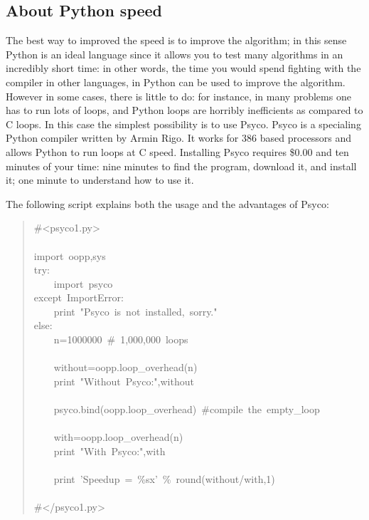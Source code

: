 \documentclass[10pt,english]{article}
\begin{document}

\hypertarget{about-python-speed}{}
\subsection*{About Python speed}

The best way to improved the speed is to improve the algorithm; in
this sense Python is an ideal language since it allows you to test
many algorithms in an incredibly short time: in other words, the time you 
would spend fighting with the compiler in other languages, in Python
can be used to improve the algorithm. 
However in some cases, there is little to do: for instance, in many
problems one has to run lots of loops, and Python loops are horribly
inefficients as compared to C loops. In this case the simplest possibility 
is to use Psyco. Psyco is a specialing Python compiler written by Armin
Rigo. It works for 386 based processors and allows Python to run loops at 
C speed. Installing Psyco requires {\$}0.00 and ten minutes of your time:
nine minutes to find the program, download it, and install it; one
minute to understand how to use it.

The following script explains both the usage and the advantages of Psyco:
\begin{quote}
\begin{ttfamily}\begin{flushleft}
\mbox{{\#}<psyco1.py>}\\
\mbox{}\\
\mbox{import~oopp,sys}\\
\mbox{try:~}\\
\mbox{~~~~import~psyco}\\
\mbox{except~ImportError:~}\\
\mbox{~~~~print~"Psyco~is~not~installed,~sorry."}\\
\mbox{else:}\\
\mbox{~~~~n=1000000~{\#}~1,000,000~loops}\\
\mbox{}\\
\mbox{~~~~without=oopp.loop{\_}overhead(n)~}\\
\mbox{~~~~print~"Without~Psyco:",without}\\
\mbox{}\\
\mbox{~~~~psyco.bind(oopp.loop{\_}overhead)~{\#}compile~the~empty{\_}loop}\\
\mbox{}\\
\mbox{~~~~with=oopp.loop{\_}overhead(n)~}\\
\mbox{~~~~print~"With~Psyco:",with}\\
\mbox{}\\
\mbox{~~~~print~'Speedup~=~{\%}sx'~{\%}~round(without/with,1)}\\
\mbox{}\\
\mbox{{\#}</psyco1.py>}
\end{flushleft}\end{ttfamily}
\end{quote}
\end{document}

